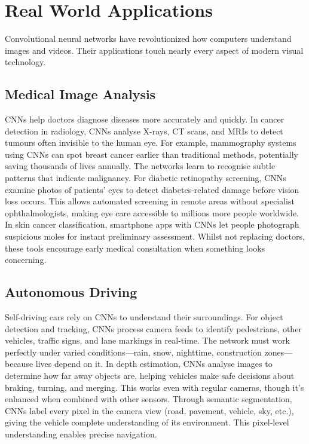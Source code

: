 
\section{Real World Applications}
\label{sec:cnn-real-world}


Convolutional neural networks have revolutionized how computers understand images and videos. Their applications touch nearly every aspect of modern visual technology.

\subsection{Medical Image Analysis}

CNNs help doctors diagnose diseases more accurately and quickly. In cancer detection in radiology, CNNs analyse X-rays, CT scans, and MRIs to detect tumours often invisible to the human eye. For example, mammography systems using CNNs can spot breast cancer earlier than traditional methods, potentially saving thousands of lives annually. The networks learn to recognise subtle patterns that indicate malignancy. For diabetic retinopathy screening, CNNs examine photos of patients' eyes to detect diabetes-related damage before vision loss occurs. This allows automated screening in remote areas without specialist ophthalmologists, making eye care accessible to millions more people worldwide. In skin cancer classification, smartphone apps with CNNs let people photograph suspicious moles for instant preliminary assessment. Whilst not replacing doctors, these tools encourage early medical consultation when something looks concerning.

\subsection{Autonomous Driving}

Self-driving cars rely on CNNs to understand their surroundings. For object detection and tracking, CNNs process camera feeds to identify pedestrians, other vehicles, traffic signs, and lane markings in real-time. The network must work perfectly under varied conditions—rain, snow, nighttime, construction zones—because lives depend on it. In depth estimation, CNNs analyse images to determine how far away objects are, helping vehicles make safe decisions about braking, turning, and merging. This works even with regular cameras, though it's enhanced when combined with other sensors. Through semantic segmentation, CNNs label every pixel in the camera view (road, pavement, vehicle, sky, etc.), giving the vehicle complete understanding of its environment. This pixel-level understanding enables precise navigation.


